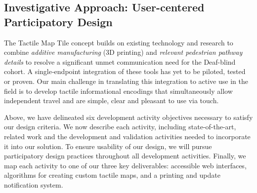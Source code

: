 
\subsection{Investigative Approach: User-centered Participatory Design}

\label{sec:approach}


The Tactile Map Tile concept builds on existing technology and research to combine \textit{additive manufacturing} (3D printing) and \textit{relevant pedestrian pathway details} to resolve a significant unmet communication need  for the Deaf-blind cohort. A single‐endpoint integration of these tools has yet to be piloted, tested or proven.  Our main challenge in translating this integration to active use in the field is to develop tactile informational encodings that simultaneously allow independent travel and are simple, clear  and pleasant to use via touch. 


Above, we have delineated six development activity objectives necessary to satisfy our design criteria. We now describe each activity, including state-of-the-art, related work and the development and validation activities needed to incorporate it into our solution. To ensure usability of our design, we will pursue participatory design practices throughout all development activities. 
Finally, we map each activity to one of our three key deliverables: accessible web interfaces, algorithms for creating custom tactile maps, and a printing and update notification system.

